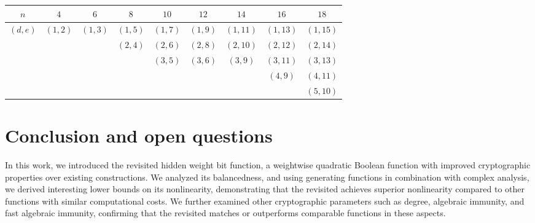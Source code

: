 \documentclass[11pt]{llncs}
\begin{document}
\begin{table}[ht]
	\small
	\centering
	\begin{tabular}{|c|c|c|c|c|c|c|c|c|}
		\hline
		$ n $      & $4$     & $6$     & $8$     & $10$    & $12$    & $14$    & $16$    & $18$    \\ \hline
		$(d, e)$ & $(1,2)$ & $(1,3)$ & $(1,5)$  & $(1,7)$ & $(1,9)$ & $(1,11)$ & $(1,13)$ & $(1,15)$ \\ 
		&     &    & $(2,4)$  & $(2,6)$ & $(2,8)$ & $(2,10)$ & $(2,12)$ & $(2,14)$\\ 
		&     &    &     & $(3,5)$ & $(3,6)$ & $(3,9)$ & $(3,11)$ & $(3,13)$\\ 
		&     &    &     &  &  &  & $(4,9)$ & $(4,11)$\\ 
	 	&     &    &     &  &  &  &  & $(5,10)$ \\ \hline
	\end{tabular}
	\label{table:FAI}
\end{table}

\section{Conclusion and open questions}

In this work, we introduced the revisited hidden weight bit function, a weightwise quadratic Boolean function with improved cryptographic properties over existing constructions. 
We analyzed its balancedness, and using generating functions in combination with complex analysis, we derived interesting lower bounds on its nonlinearity, demonstrating that the revisited \hwbf{} achieves superior nonlinearity compared to other functions with similar computational costs. 
We further examined other cryptographic parameters such as degree, algebraic immunity, and fast algebraic immunity, confirming that the revisited \hwbf{} matches or outperforms comparable functions in these aspects.

\end{document}

